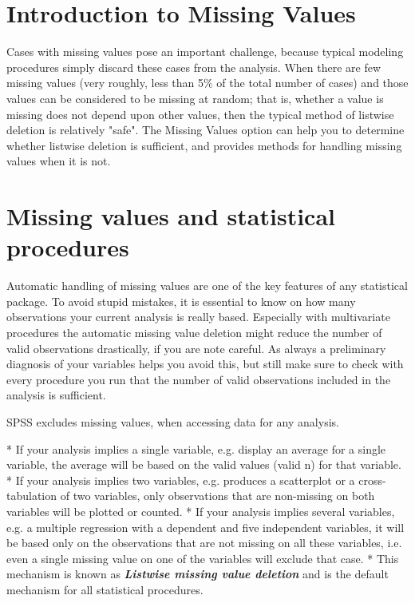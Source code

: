 
\section{Introduction to Missing Values}

Cases with missing values pose an important challenge, because typical modeling procedures simply discard these cases from the analysis. When there are few missing values (very roughly, less than 5\% of the total number of cases) and those values can be considered to be missing at random; that is, whether a value is missing does not depend upon other values, then the typical method of listwise deletion is relatively "safe". The Missing Values option can help you to determine whether listwise deletion is sufficient, and provides methods for handling missing values when it is not.
\section{Missing values and statistical procedures}
Automatic handling of missing values are one of the key features of any statistical package. To avoid stupid mistakes, it is essential to know on how many observations your current analysis is really based. Especially with multivariate procedures the automatic missing value deletion might reduce the number of valid observations drastically, if you are note careful. As always a preliminary diagnosis of your variables helps you avoid this, but still make sure to check with every procedure you run that the number of valid observations included in the analysis is sufficient.

SPSS excludes missing values, when accessing data for any analysis.


*  If your analysis implies a single variable, e.g. display an average for a single variable, the average will be based on the valid values (valid n) for that variable.
*  If your analysis implies two variables, e.g. produces a scatterplot or a cross-tabulation of two variables, only observations that are non-missing on both variables will be plotted or counted.
*  If your analysis implies several variables, e.g. a multiple regression with a dependent and five independent variables, it will be based only on the observations that are not missing on all these variables, i.e. even a single missing value on one of the variables will exclude that case.
*  This mechanism is known as \textbf{\textit{Listwise missing value deletion}} and is the default mechanism for all statistical procedures. 

